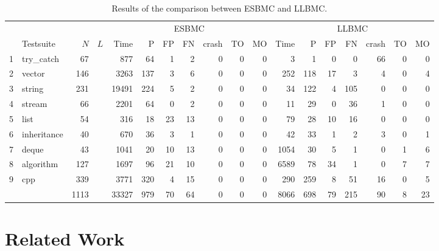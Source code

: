\documentclass[a4paper]{llncs}
\begin{document}
\begin{table}[t]
\renewcommand\arraystretch{1.18}
\setlength{\tabcolsep}{4pt}
\begin{center} {\small
\begin{tabular}{|c|l|r|r||r|r|r|r|r|r|r|r|r|r|r|r|r|r|}
\hline 
  & & & & \multicolumn{7}{c|}{ESBMC} & \multicolumn{7}{c|}{LLBMC} \\  \cline{5-18}
  & Testsuite & $N$ & $L$ & Time & P   & FP  & FN  & crash & TO  & MO & Time & P   & FP  & FN  & crash & TO  & MO \\\hline
1 & try\_catch & 67 & & 877 & 64 & 1 & 2 & 0 & 0 & 0 & 3 & 1 & 0 & 0 & 66 & 0 & 0 \\
\hline
2 & vector & 146 & & 3263 & 137 & 3 & 6 & 0 & 0 & 0  & 252 & 118 & 17 & 3 & 4 & 0 & 4\\
\hline
3 & string & 231 & & 19491 & 224& 5 & 2 & 0 & 0 & 0 & 34 & 122 & 4 & 105 & 0 & 0 & 0\\
\hline
4 & stream & 66 & & 2201 & 64 & 0 & 2 & 0 & 0 & 0 & 11 & 29 & 0 & 36 & 1 & 0 & 0\\
\hline
5 & list & 54 & & 316 & 18 & 23 & 13 & 0 & 0 & 0 & 79 & 28 & 10 & 16 & 0 & 0 & 0\\
\hline
6 & inheritance & 40 & & 670 & 36 & 3 & 1 & 0 & 0 & 0 & 42 & 33 & 1 & 2 & 3 & 0 & 1\\
\hline
7 & deque & 43 & & 1041 & 20 & 10 & 13 & 0 & 0 & 0 & 1054 & 30 & 5 & 1 & 0 & 1 & 6\\
\hline
8 & algorithm & 127 & & 1697 & 96 & 21 & 10 & 0 & 0 & 0 & 6589 & 78 & 34 & 1 & 0 & 7 & 7\\
\hline
9 & cpp & 339 & & 3771 & 320 & 4 & 15 & 0 & 0 & 0 & 290 & 259 & 8 & 51 & 16 & 0 & 5\\
\hline\hline 
  &     &  1113 & & 33327 & 979 & 70 & 64 & 0 & 0 & 0 & 8066 & 698 & 79 & 215 & 90 & 8 & 23 \\
\hline
\end{tabular} }
\end{center}
\caption{Results of the comparison between ESBMC and LLBMC.}
\label{table:results-of-the-comparison-between-ESBMC-and-LLBMC}
\end{table}




\section{Related Work}
\end{document}
